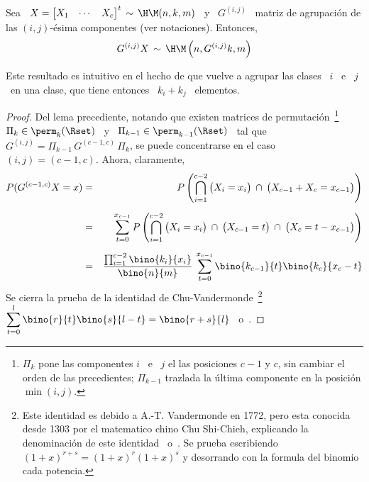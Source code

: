 %
\begin{lema}\label{Lem:MP:StabAgregacionHipergeomMulti}
%
  Sea  \ $X =  \begin{bmatrix} X_1  & \cdots  & X_c  \end{bmatrix}^t \,  \sim \,
  \H\M(n,k,m)$ \ y \ $G^{(i,j)}$ \ matriz de agrupaci\'on de las $(i,j)$-\'esima
  componentes (ver notaciones). Entonces,
  \[
  G^{(i,j)} X \, \sim \, \H\M\left( n , G^{(i,j)} k , m \right)  
  \]
\end{lema}
%
Este resultado es  intuitivo en el hecho  de que vuelve a agrupar  las clases \
$i$ \ e \ $j$ \ en una clase, que tiene entonces  \ $k_i + k_j$ \ elementos.
%

%
\begin{proof}
 Del  lema precediente,
  notando  que  existen  matrices  de permutaci\'on~\footnote{$\Pi_k$  pone  las
    componentes $i$ \ e \ $j$ el  las posiciones $c-1$ y $c$, sin cambiar el orden
    de  las  precedientes;  $\Pi_{k-1}$  trazlada  la  \'ultima  componente  en  la
    posici\'on $\min(i,j)$.}  \ $\Pi_k \in  \perm_k(\Rset)$ \ y \ $\Pi_{k-1} \in
  \perm_{k-1}(\Rset)$ \ tal que \ $G^{(i,j)} = \Pi_{k-1} \, G^{(c-1,c)} \, \Pi_k$,
  se puede concentrarse en el caso \ $(i,j) = (c-1,c)$. Ahora, claramente,
  \begin{eqnarray*}
  P(G^{(c-1,c)} X = x) & = & \displaystyle P\left( \bigcap_{i=1}^{c-2} \big( X_i = x_i \big)
  \: \cap \: \big( X_{c-1} + X_c = x_{c-1} \big) \right)\\[2mm]
  & = & \displaystyle \sum_{t=0}^{x_{c-1}} P\left( \bigcap_{i=1}^{c-2} \big( X_i = x_i \big)
  \: \cap \: \big( X_{c-1} = t\big) \: \cap \: \big( X_c = t-x_{c-1} \big) \right)\\[2mm]
  & = & \frac{\prod_{i=1}^{c-2} \bino{k_i}{x_i}}{\bino{n}{m}}
  \: \sum_{t=0}^{x_{c-1}} \bino{k_{c-1}}{t}\bino{k_c}{x_c-t}
  \end{eqnarray*}
  Se  cierra  la  prueba   de  la  identidad  de  Chu-Vandermonde~\footnote{Este
    identidad es  debido a A.-T. Vandermonde  en 1772, pero  esta conocida desde
    1303 por el matematico chino  Chu Shi-Chieh, explicando la denominaci\'on de
    este    identidad~\cite{AndLar94}   o~\cite[p.~59-60]{Ask75}.    Se   prueba
    escribiendo $(1+x)^{r+s} = (1+x)^r (1+x)^s$  y desorrando con la formula del
    binomio       cada      potencia.}        $\displaystyle      \sum_{t=0}^{l}
  \bino{r}{t}\bino{s}{l-t}   =  \bino{r+s}{l}$~\cite[Ec.~(21),  p.~59]{Knu97_v1}
  o~\cite[Ec.~0.156]{GraRyz15}.
\end{proof}

